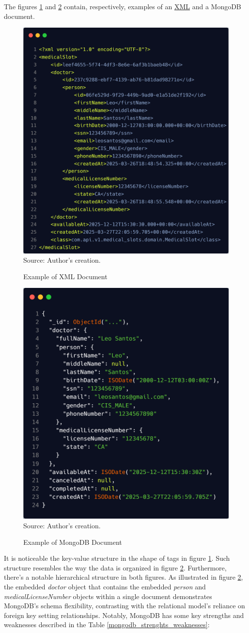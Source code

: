 The figures \ref{fig:xml} and \ref{fig:mongodb} contain, respectively, examples of an \hyperref[appendix:glossary]{XML} and a MongoDB document.

\begin{figure}[H]
    \centering
    \caption{Example of XML Document}
    \includegraphics[width=0.5\linewidth]{figures/db/xml.png}
    \label{fig:xml}
    \\ \footnotesize Source: Author's creation.
\end{figure}

\begin{figure}[H]
    \centering
    \caption{Example of MongoDB Document}
    \includegraphics[width=0.5\linewidth]{figures/db/mongodb.png}
    \label{fig:mongodb}
    \\ \footnotesize Source: Author's creation.
\end{figure}

It is noticeable the key-value structure in the shape of tags in figure \ref{fig:xml}. Such structure resembles the way the data  is organized in figure \ref{fig:mongodb}. Furthermore, there's a notable hierarchical structure in both figures.  As illustrated in figure \ref{fig:mongodb}, the embedded \textit{doctor} object that contains the embedded \textit{person} 
 and \textit{medicalLicenseNumber} objects within a single document demonstrates MongoDB's schema flexibility,  contrasting with the relational model's reliance on foreign key setting relationships. Notably, MongoDB has some key strengths and weaknesses described in the Table \ref{mongodb_strenghts_weaknesses}:

